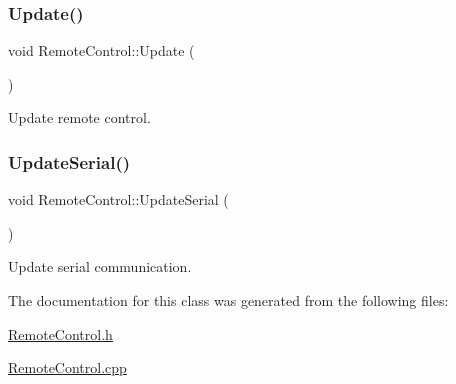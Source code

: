 \subsubsection{\texorpdfstring{Update()}{Update()}}
{\footnotesize\ttfamily void Remote\+Control\+::\+Update (\begin{DoxyParamCaption}{ }\end{DoxyParamCaption})}



Update remote control. 

\mbox{\label{classRemoteControl_ae53e5ef85ab672a133bd4485fb7ff8cd}} 
\subsubsection{\texorpdfstring{UpdateSerial()}{UpdateSerial()}}
{\footnotesize\ttfamily void Remote\+Control\+::\+Update\+Serial (\begin{DoxyParamCaption}{ }\end{DoxyParamCaption})}



Update serial communication. 



The documentation for this class was generated from the following files\+:\begin{DoxyCompactItemize}
\item 
\mbox{\hyperlink{RemoteControl_8h}{Remote\+Control.\+h}}\item 
\mbox{\hyperlink{RemoteControl_8cpp}{Remote\+Control.\+cpp}}\end{DoxyCompactItemize}

